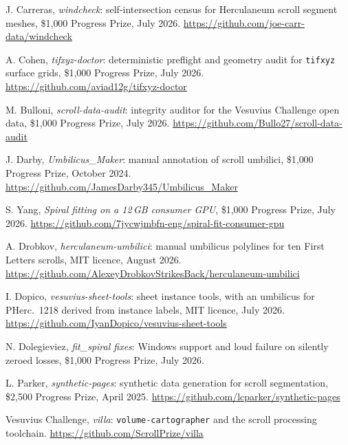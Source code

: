  J. Carreras, \emph{windcheck}: self-intersection census for Herculaneum
  scroll segment meshes, \$1{,}000 Progress Prize, July 2026.
  \url{https://github.com/joe-carr-data/windcheck}

 A. Cohen, \emph{tifxyz-doctor}: deterministic preflight and geometry
  audit for \texttt{tifxyz} surface grids, \$1{,}000 Progress Prize, July 2026.
  \url{https://github.com/aviad12g/tifxyz-doctor}

 M. Bulloni, \emph{scroll-data-audit}: integrity auditor for the Vesuvius
  Challenge open data, \$1{,}000 Progress Prize, July 2026.
  \url{https://github.com/Bullo27/scroll-data-audit}

 J. Darby, \emph{Umbilicus\_Maker}: manual annotation of scroll umbilici,
  \$1{,}000 Progress Prize, October 2024.
  \url{https://github.com/JamesDarby345/Umbilicus_Maker}

 S. Yang, \emph{Spiral fitting on a 12\,GB consumer GPU}, \$1{,}000
  Progress Prize, July 2026. \url{https://github.com/7jycwjmbfn-eng/spiral-fit-consumer-gpu}

 A. Drobkov, \emph{herculaneum-umbilici}: manual umbilicus polylines for ten
  First Letters scrolls, MIT licence, August 2026.
  \url{https://github.com/AlexeyDrobkovStrikesBack/herculaneum-umbilici}

 I. Dopico, \emph{vesuvius-sheet-tools}: sheet instance tools, with an umbilicus
  for PHerc.\ 1218 derived from instance labels, MIT licence, July 2026.
  \url{https://github.com/IyanDopico/vesuvius-sheet-tools}

 N. Dolegieviez, \emph{fit\_spiral fixes}: Windows support and loud
  failure on silently zeroed losses, \$1{,}000 Progress Prize, July 2026.

 L. Parker, \emph{synthetic-pages}: synthetic data generation for
  scroll segmentation, \$2{,}500 Progress Prize, April 2025.
  \url{https://github.com/lcparker/synthetic-pages}

 Vesuvius Challenge, \emph{villa}: \texttt{volume-cartographer} and the scroll
  processing toolchain. \url{https://github.com/ScrollPrize/villa}

